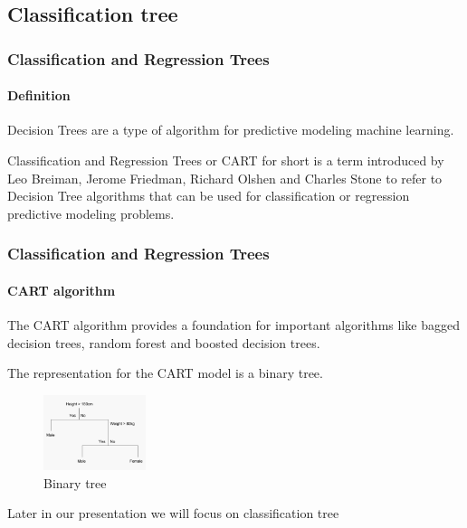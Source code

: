 \subsection{Classification tree} %

\begin{frame}
	\frametitle{Classification and Regression Trees}
		\framesubtitle{Definition}

	\begin{block}{}
		  Decision Trees are a type of algorithm for predictive modeling machine learning.
	\end{block}

	\vfill
		
	Classification and Regression Trees or CART for short is a term introduced by Leo Breiman, Jerome Friedman, Richard Olshen and Charles Stone to refer to Decision Tree algorithms that can be used for classification or regression predictive modeling problems.

\end{frame}

\begin{frame}
	\frametitle{Classification and Regression Trees}
		\framesubtitle{CART algorithm}

	\begin{block}{}
		The CART algorithm provides a foundation for important algorithms like bagged decision trees, random forest and boosted decision trees.
	\end{block}

	\vfill
		
	The representation for the CART model is a binary tree.
	
	\begin{figure}
		\includegraphics[width=3cm]{./figures/Binary_tree}
		\caption{Binary tree}
	\end{figure}

	\vspace{-0.5cm}

	\tiny Later in our presentation we will focus on  classification tree

\end{frame}

